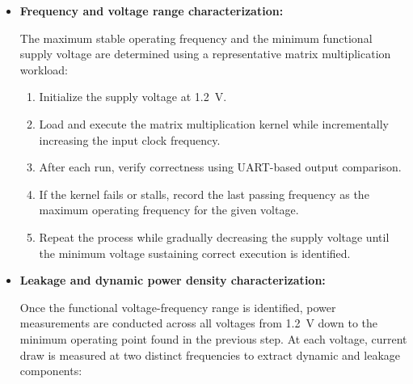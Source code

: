             \vspace{-1em}
            \begin{itemize}
                \item \textbf{Frequency and voltage range characterization:}
                
                The maximum stable operating frequency and the minimum functional supply voltage are determined using a representative matrix multiplication workload:
                
                \begin{enumerate}
                    \item Initialize the supply voltage at \SI{1.2}{\volt}.
                    
                    \item Load and execute the matrix multiplication kernel while incrementally increasing the input clock frequency.
                    
                    \item After each run, verify correctness using UART-based output comparison.
                    
                    \item If the kernel fails or stalls, record the last passing frequency as the maximum operating frequency for the given voltage.
                    
                    \item Repeat the process while gradually decreasing the supply voltage until the minimum voltage sustaining correct execution is identified.
                \end{enumerate}
            
                \item \textbf{Leakage and dynamic power density characterization:}
                
                Once the functional voltage-frequency range is identified, power measurements are conducted across all voltages from \SI{1.2}{\volt} down to the minimum operating point found in the previous step. At each voltage, current draw is measured at two distinct frequencies to extract dynamic and leakage components:
                

\end{itemize}
